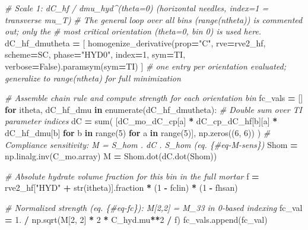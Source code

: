 \documentclass[
  a4paper,
  numbers=noendperiod,
  DIV=12]{scrreprt}
\newenvironment{Shaded}{\begin{snugshade}}{\end{snugshade}}
\newcommand{\BuiltInTok}[1]{#1}
\newcommand{\CommentTok}[1]{\textcolor[rgb]{0.56,0.35,0.01}{\textit{#1}}}
\newcommand{\ControlFlowTok}[1]{\textcolor[rgb]{0.13,0.29,0.53}{\textbf{#1}}}
\newcommand{\DecValTok}[1]{\textcolor[rgb]{0.00,0.00,0.81}{#1}}
\newcommand{\FloatTok}[1]{\textcolor[rgb]{0.00,0.00,0.81}{#1}}
\newcommand{\KeywordTok}[1]{\textcolor[rgb]{0.13,0.29,0.53}{\textbf{#1}}}
\newcommand{\NormalTok}[1]{#1}
\newcommand{\OperatorTok}[1]{\textcolor[rgb]{0.81,0.36,0.00}{\textbf{#1}}}
\newcommand{\StringTok}[1]{\textcolor[rgb]{0.31,0.60,0.02}{#1}}
\newcommand{\VariableTok}[1]{\textcolor[rgb]{0.00,0.00,0.00}{#1}}
\begin{document}
\begin{Shaded}
\begin{Highlighting}[]
    \CommentTok{\# Scale 1: dC\_hf / dmu\_hyd\^{}(theta=0)  (horizontal needles, index=1 = transverse mu\_T)}
    \CommentTok{\# The general loop over all bins (range(ntheta)) is commented out; only the}
    \CommentTok{\# most critical orientation (theta=0, bin 0) is used here.}
\NormalTok{    dC\_hf\_dmutheta }\OperatorTok{=}\NormalTok{ [}
\NormalTok{        homogenize\_derivative(prop}\OperatorTok{=}\StringTok{"C"}\NormalTok{, rve}\OperatorTok{=}\NormalTok{rve2\_hf, scheme}\OperatorTok{=}\NormalTok{SC,}
\NormalTok{                               phase}\OperatorTok{=}\StringTok{"HYD0"}\NormalTok{, index}\OperatorTok{=}\DecValTok{1}\NormalTok{, sym}\OperatorTok{=}\NormalTok{TI, verbose}\OperatorTok{=}\VariableTok{False}\NormalTok{).paramsym(sym}\OperatorTok{=}\NormalTok{TI)}
\NormalTok{    ]  }\CommentTok{\# one entry per orientation evaluated; generalize to range(ntheta) for full minimization}

    \CommentTok{\# Assemble chain rule and compute strength for each orientation bin}
\NormalTok{    fc\_vals }\OperatorTok{=}\NormalTok{ []}
    \ControlFlowTok{for}\NormalTok{ itheta, dC\_hf\_dmu }\KeywordTok{in} \BuiltInTok{enumerate}\NormalTok{(dC\_hf\_dmutheta):}
        \CommentTok{\# Double sum over TI parameter indices}
\NormalTok{        dC }\OperatorTok{=} \BuiltInTok{sum}\NormalTok{(}
\NormalTok{            [dC\_mo\_dC\_cp[a] }\OperatorTok{*}\NormalTok{ dC\_cp\_dC\_hf[b][a] }\OperatorTok{*}\NormalTok{ dC\_hf\_dmu[b]}
             \ControlFlowTok{for}\NormalTok{ b }\KeywordTok{in} \BuiltInTok{range}\NormalTok{(}\DecValTok{5}\NormalTok{) }\ControlFlowTok{for}\NormalTok{ a }\KeywordTok{in} \BuiltInTok{range}\NormalTok{(}\DecValTok{5}\NormalTok{)],}
\NormalTok{            np.zeros((}\DecValTok{6}\NormalTok{, }\DecValTok{6}\NormalTok{))}
\NormalTok{        )}
        \CommentTok{\# Compliance sensitivity: M = S\_hom . dC . S\_hom  (eq. \{\#eq{-}M{-}sens\})}
\NormalTok{        Shom }\OperatorTok{=}\NormalTok{ np.linalg.inv(C\_mo.array)}
\NormalTok{        M }\OperatorTok{=}\NormalTok{ Shom.dot(dC.dot(Shom))}

        \CommentTok{\# Absolute hydrate volume fraction for this bin in the full mortar}
\NormalTok{        f }\OperatorTok{=}\NormalTok{ rve2\_hf[}\StringTok{"HYD"} \OperatorTok{+} \BuiltInTok{str}\NormalTok{(itheta)].fraction }\OperatorTok{*}\NormalTok{ (}\DecValTok{1} \OperatorTok{{-}}\NormalTok{ fclin) }\OperatorTok{*}\NormalTok{ (}\DecValTok{1} \OperatorTok{{-}}\NormalTok{ fhsan)}

        \CommentTok{\# Normalized strength (eq. \{\#eq{-}fc\}): M[2,2] = M\_33 in 0{-}based indexing}
\NormalTok{        fc\_val }\OperatorTok{=} \FloatTok{1.} \OperatorTok{/}\NormalTok{ np.sqrt(M[}\DecValTok{2}\NormalTok{, }\DecValTok{2}\NormalTok{] }\OperatorTok{*} \DecValTok{2} \OperatorTok{*}\NormalTok{ C\_hyd.mu}\OperatorTok{**}\DecValTok{2} \OperatorTok{/}\NormalTok{ f)}
\NormalTok{        fc\_vals.append(fc\_val)}


\end{Highlighting}
\end{Shaded}
\end{document}
